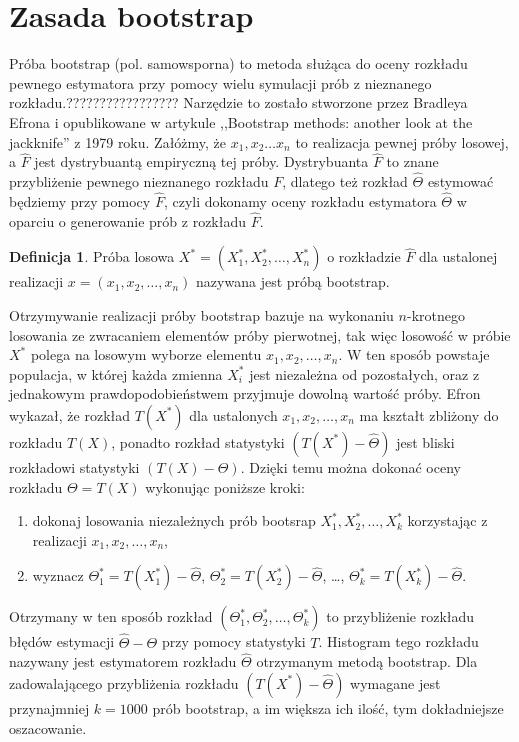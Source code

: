\documentclass[inzynierska]{pwr_wmat_praca_dyplomowa}
\theoremstyle{plain}
\numberwithin{theorem}{chapter}
\theoremstyle{definition}
\numberwithin{theorem}{chapter}
\newtheorem{definition}[theorem]{Definicja}
\begin{document}
\section{Zasada bootstrap}
Próba bootstrap (pol. samowsporna) to metoda służąca do oceny rozkładu pewnego estymatora przy pomocy wielu symulacji prób z nieznanego rozkładu.????????????????? Narzędzie to zostało stworzone przez Bradleya Efrona i opublikowane w artykule ,,Bootstrap methods: another look at the jackknife'' z 1979 roku. Załóżmy, że $x_1, x_2 \dots x_n$ to realizacja pewnej próby losowej, a $\hat{F}$ jest dystrybuantą empiryczną tej próby. Dystrybuanta $\hat{F}$ to znane przybliżenie pewnego nieznanego rozkładu $F$, dlatego też rozkład $\hat{\Theta}$ estymować będziemy przy pomocy $\hat{F}$, czyli dokonamy oceny rozkładu estymatora $\hat{\Theta}$ w oparciu o generowanie prób z rozkładu $\hat{F}$. 
\begin{definition}
	Próba losowa $X^* = (X_1^*, X_2^*, \dots, X_n^*)$ o rozkładzie $\hat{F}$ dla ustalonej realizacji $x = (x_1, x_2, \dots, x_n)$ nazywana jest próbą bootstrap.
\end{definition}
Otrzymywanie realizacji próby bootstrap bazuje na wykonaniu $n$-krotnego losowania ze zwracaniem elementów próby pierwotnej, tak więc losowość w próbie $X^*$ polega na losowym wyborze elementu $x_1, x_2, \dots, x_n$. W ten sposób powstaje populacja, w której każda zmienna $X_i^*$ jest niezależna od pozostałych, oraz z jednakowym prawdopodobieństwem  przyjmuje dowolną wartość próby. Efron wykazał, że rozkład $T(X^*)$ dla ustalonych $x_1, x_2, \dots, x_n$ ma kształt zbliżony do rozkładu $T(X)$, ponadto rozkład statystyki $(T(X^*)-\hat{\Theta})$ jest bliski rozkładowi statystyki $(T(X)-\Theta)$. Dzięki temu można dokonać oceny rozkładu $\Theta=T(X)$ wykonując poniższe kroki:
\begin{enumerate}
	\item dokonaj losowania niezależnych prób bootsrap $X_1^*, X_2^*, \dots, X_k^*$ korzystając z realizacji $x_1, x_2, \dots, x_n$,
	\item wyznacz $\Theta_1^*=T(X_1^*)-\hat{\Theta}$, $\Theta_2^*=T(X_2^*)-\hat{\Theta}$, \dots, $\Theta_k^*=T(X_k^*)-\hat{\Theta}$.
\end{enumerate}
Otrzymany w ten sposób rozkład $(\Theta_1^*, \Theta_2^*, \dots, \Theta_k^*)$ to przybliżenie rozkładu błędów estymacji $\hat{\Theta}-\Theta$ przy pomocy statystyki $T$. Histogram tego rozkładu nazywany jest estymatorem rozkładu $\hat{\Theta}$ otrzymanym metodą bootstrap. Dla zadowalającego przybliżenia rozkładu $(T(X^*)-\hat{\Theta})$ wymagane jest przynajmniej $k=1000$ prób bootstrap, a im większa ich ilość, tym dokładniejsze oszacowanie.  
\end{document}
